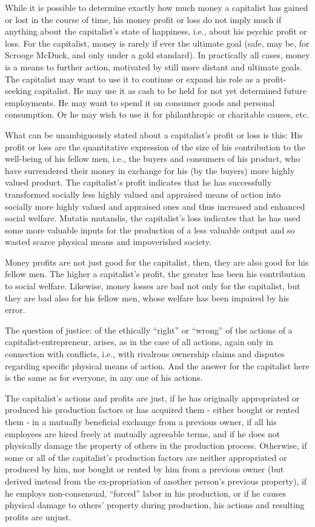 While it is possible to determine exactly how much money a capitalist has gained or lost in the course of time, his money profit or loss do not imply much if anything about the capitalist’s state of happiness, i.e., about his psychic profit or loss. For the capitalist, money is rarely if ever the ultimate goal (safe, may be, for Scrooge McDuck, and only under a gold standard). In practically all cases, money is a means to further action, motivated by still more distant and ultimate goals. The capitalist may want to use it to continue or expand his role as a profit-seeking capitalist. He may use it as cash to be held for not yet determined future employments. He may want to spend it on consumer goods and personal consumption. Or he may wish to use it for philanthropic or charitable causes, etc.

What can be unambiguously stated about a capitalist’s profit or loss is this: His profit or loss are the quantitative expression of the size of his contribution to the well-being of his fellow men, i.e., the buyers and consumers of his product, who have surrendered their money in exchange for his (by the buyers) more highly valued product. The capitalist’s profit indicates that he has successfully transformed socially less highly valued and appraised means of action into socially more highly valued and appraised ones and thus increased and enhanced social welfare. Mutatis mutandis, the capitalist’s loss indicates that he has used some more valuable inputs for the production of a less valuable output and so wasted scarce physical means and impoverished society.

Money profits are not just good for the capitalist, then, they are also good for his fellow men. The higher a capitalist’s profit, the greater has been his contribution to social welfare. Likewise, money losses are bad not only for the capitalist, but they are bad also for his fellow men, whose welfare has been impaired by his error.

The question of justice: of the ethically ``right'' or ``wrong'' of the actions of a capitalist-entrepreneur, arises, as in the case of all actions, again only in connection with conflicts, i.e., with rivalrous ownership claims and disputes regarding specific physical means of action. And the answer for the capitalist here is the same as for everyone, in any one of his actions.

The capitalist’s actions and profits are just, if he has originally appropriated or produced his production factors or has acquired them - either bought or rented them - in a mutually beneficial exchange from a previous owner, if all his employees are hired freely at mutually agreeable terms, and if he does not physically damage the property of others in the production process. Otherwise, if some or all of the capitalist’s production factors are neither appropriated or produced by him, nor bought or rented by him from a previous owner (but derived instead from the ex-propriation of another person’s previous property), if he employs non-consensual, ``forced'' labor in his production, or if he causes physical damage to others’ property during production, his actions and resulting profits are unjust.

